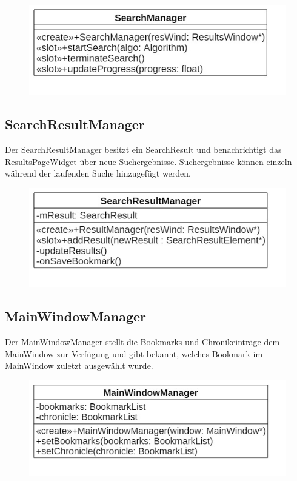 \begin{figure}[H]
\centering
\includegraphics[scale=0.5]{img/Klassendiagramm/Klassen/Controller/SearchManager}
\label{fig:searchManager}
\end{figure}

\subsection*{SearchResultManager}
Der SearchResultManager besitzt ein SearchResult und benachrichtigt das ResultsPageWidget über neue Suchergebnisse. Suchergebnisse können einzeln während der laufenden Suche hinzugefügt werden.

\begin{figure}[H]
\centering
\includegraphics[scale=0.5]{img/Klassendiagramm/Klassen/Controller/SearchResultManager}
\label{fig:searchResultManager}
\end{figure}

\subsection*{MainWindowManager}
Der MainWindowManager stellt die Bookmarks und Chronikeinträge dem MainWindow zur Verfügung und gibt bekannt, welches Bookmark im MainWindow zuletzt ausgewählt wurde.

\begin{figure}[H]
\centering
\includegraphics[scale=0.5]{img/Klassendiagramm/Klassen/Controller/MainWindowManager}
\label{fig:mainWindowManager}
\end{figure}

